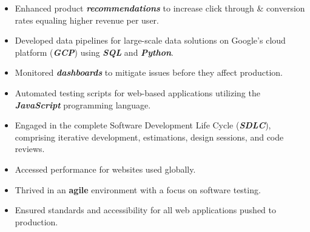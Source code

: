 \documentclass[10pt,a4paper,ragged2e,withhyper]{altacv}
\begin{document}
\begin{paracol}{2}

\begin{itemize}
\item Enhanced product \textbf{\textit{recommendations}} to increase click through \& conversion rates equaling higher revenue per user. 
\item Developed data pipelines for large-scale data solutions on Google's cloud platform (\textbf{\textit{GCP}}) using \textbf{\textit{SQL}} and \textbf{\textit{Python}}.
\item Monitored \textbf{\textit{dashboards}} to mitigate issues before they affect production.
\end{itemize}

\begin{itemize}
\item Automated testing scripts for web-based applications utilizing the \textbf{\textit{JavaScript}} programming language. 
\item Engaged in the complete Software Development Life Cycle (\textbf{\textit{SDLC}}), comprising iterative development, estimations, design sessions, and code reviews.
\end{itemize}

\divider

\begin{itemize}
\item Accessed performance for websites used globally. 
\item Thrived in an \textbf{agile} environment with a focus on software testing. 
\item Ensured standards and accessibility for all web applications pushed to production.
\end{itemize}

\divider



\end{paracol}
\end{document}
